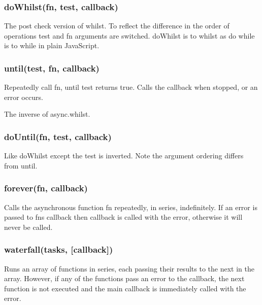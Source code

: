 \label{_doWhilst}%
 \subsubsection*{do\+Whilst(fn, test, callback)}

The post check version of whilst. To reflect the difference in the order of operations {\ttfamily test} and {\ttfamily fn} arguments are switched. {\ttfamily do\+Whilst} is to {\ttfamily whilst} as {\ttfamily do while} is to {\ttfamily while} in plain Java\+Script. 



\label{_until}%
 \subsubsection*{until(test, fn, callback)}

Repeatedly call fn, until test returns true. Calls the callback when stopped, or an error occurs.

The inverse of async.\+whilst. 



\label{_doUntil}%
 \subsubsection*{do\+Until(fn, test, callback)}

Like do\+Whilst except the test is inverted. Note the argument ordering differs from {\ttfamily until}. 



\label{_forever}%
 \subsubsection*{forever(fn, callback)}

Calls the asynchronous function \textquotesingle{}fn\textquotesingle{} repeatedly, in series, indefinitely. If an error is passed to fn\textquotesingle{}s callback then \textquotesingle{}callback\textquotesingle{} is called with the error, otherwise it will never be called. 



\label{_waterfall}%
 \subsubsection*{waterfall(tasks, \mbox{[}callback\mbox{]})}

Runs an array of functions in series, each passing their results to the next in the array. However, if any of the functions pass an error to the callback, the next function is not executed and the main callback is immediately called with the error.

